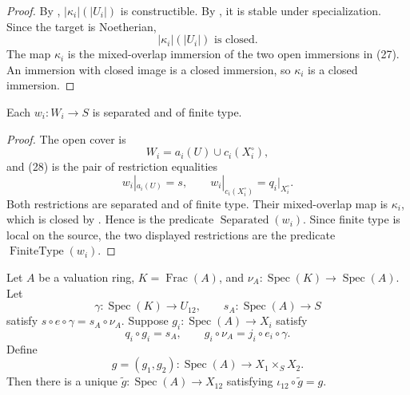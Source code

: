 \begin{proof}
  By ,
  $|\kappa_i|(|U_i|)$ is constructible.  By
  , it is stable
  under specialization.  Since the target is Noetherian,
  \[
    |\kappa_i|(|U_i|)\text{ is closed}.
  \]
  The map $\kappa_i$ is the mixed-overlap immersion of the two open
  immersions in (27).  An immersion with closed image is a closed immersion,
  so $\kappa_i$ is a closed immersion.
\end{proof}

\begin{lemma}
  \label{lemma:nagata-intermediate-separated}

  Each $w_i\colon W_i\to S$ is separated and of finite type.
\end{lemma}

\begin{proof}
  The open cover is
  \[
    W_i=a_i(U)\cup c_i(X_i^\circ),
  \]
  and (28) is the pair of restriction equalities
  \[
    w_i|_{a_i(U)}=s,\qquad
    w_i|_{c_i(X_i^\circ)}=q_i|_{X_i^\circ}.
  \]
  Both restrictions are separated and of finite type.  Their mixed-overlap
  map is $\kappa_i$, which is closed by
  .  Hence
   is the predicate
  $\operatorname{Separated}(w_i)$.  Since finite type is local on the source,
  the two displayed restrictions are the predicate
  $\operatorname{FiniteType}(w_i)$.
\end{proof}

\begin{lemma}
  \label{lemma:nagata-valuation-pair-factors-comparison}

  Let $A$ be a valuation ring, $K=\operatorname{Frac}(A)$, and
  $\nu_A\colon\operatorname{Spec}(K)\to\operatorname{Spec}(A)$.  Let
  \[
    \gamma\colon\operatorname{Spec}(K)\to U_{12},\qquad
    s_A\colon\operatorname{Spec}(A)\to S
  \]
  satisfy $s\circ e\circ\gamma=s_A\circ\nu_A$.  Suppose
  $g_i\colon\operatorname{Spec}(A)\to X_i$ satisfy
  \[
    q_i\circ g_i=s_A,\qquad
    g_i\circ\nu_A=j_i\circ e_i\circ\gamma.
  \]
  Define
  \[
    g=(g_1,g_2)\colon\operatorname{Spec}(A)\to X_1\times_SX_2.
  \]
  Then there is a unique
  $\widetilde g\colon\operatorname{Spec}(A)\to X_{12}$ satisfying
  $\iota_{12}\circ\widetilde g=g$.
\end{lemma}

